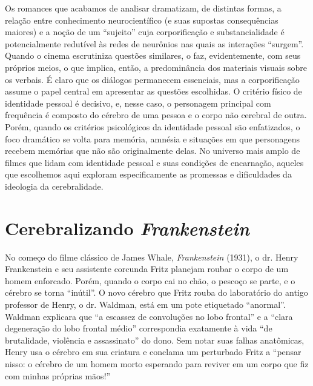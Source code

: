 Os romances que acabamos de analisar dramatizam, de distintas formas, a
relação entre conhecimento neurocientífico (e suas supostas
consequências maiores) e a noção de um ``sujeito'' cuja corporificação e
substancialidade é potencialmente redutível às redes de neurônios nas
quais as interações ``surgem''. Quando o cinema escrutiniza questões
similares, o faz, evidentemente, com seus próprios meios, o que implica,
então, a predominância dos materiais visuais sobre os verbais. É claro
que os diálogos permanecem essenciais, mas a corporificação assume o
papel central em apresentar as questões escolhidas. O critério físico de
identidade pessoal é decisivo, e, nesse caso, o personagem principal com
frequência é composto do cérebro de uma pessoa e o corpo não cerebral de
outra. Porém, quando os critérios psicológicos da identidade pessoal são
enfatizados, o foco dramático se volta para memória, amnésia e situações
em que personagens recebem memórias que não são originalmente delas. No
universo mais amplo de filmes que lidam com identidade pessoal e suas
condições de encarnação, aqueles que escolhemos aqui exploram
especificamente as promessas e dificuldades da ideologia da
cerebralidade.

\chapter{Cerebralizando \emph{Frankenstein}}

No começo do filme clássico de James Whale, \emph{Frankenstein} (1931),
o dr. Henry Frankenstein e seu assistente corcunda Fritz planejam roubar
o corpo de um homem enforcado. Porém, quando o corpo cai no chão, o
pescoço se parte, e o cérebro se torna ``inútil''. O novo cérebro que
Fritz rouba do laboratório do antigo professor de Henry, o dr. Waldman,
está em um pote etiquetado ``anormal''. Waldman explicara que ``a
escassez de convoluções no lobo frontal'' e a ``clara degeneração do
lobo frontal médio'' correspondia exatamente à vida ``de brutalidade,
violência e assassinato'' do dono. Sem notar suas falhas anatômicas,
Henry usa o cérebro em sua criatura e conclama um perturbado Fritz a
``pensar nisso: o cérebro de um homem morto esperando para reviver em um
corpo que fiz com minhas próprias mãos!''


